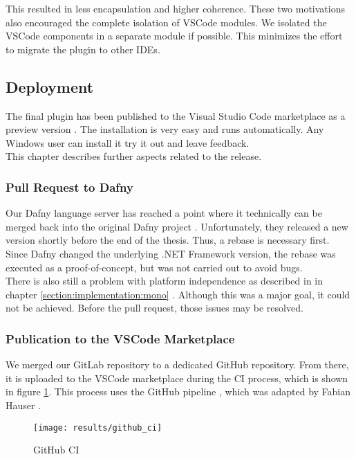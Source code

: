 This resulted in less encapsulation and higher coherence.
These two motivations also encouraged the complete isolation of VSCode modules.
We isolated the VSCode components in a separate module if possible.
This minimizes the effort to migrate the plugin to other IDEs.


\subsection{Deployment}
The final plugin has been published to the Visual Studio Code marketplace as a preview version \cite{our-dafny-plugin}.
The installation is very easy and runs automatically.
Any Windows user can install it \textendash{} try it out and leave feedback.\\

This chapter describes further aspects related to the release.

\subsubsection{Pull Request to Dafny}
Our Dafny language server has reached a point where it technically can be merged back into the original Dafny project \cite{dafny_lang_github}.
Unfortunately, they released a new version shortly before the end of the thesis.
Thus, a rebase is necessary first.
Since Dafny changed the underlying .NET Framework version, the rebase was executed as a proof-of-concept, but was not carried out to avoid bugs.\\

There is also still a problem with platform independence as described in in chapter
\ref{section:implementation:mono} \textendash{} .
Although this was a major goal, it could not be achieved.
Before the pull request, those issues may be resolved.


\subsubsection{Publication to the VSCode Marketplace}
We merged our GitLab repository to a dedicated GitHub repository.
From there, it is uploaded to the VSCode marketplace during the CI process, which is shown in figure \ref{fig:github_ci}.
This process uses the GitHub pipeline , which
was adapted by Fabian Hauser \cite{our-dafny-plugin-github-publish}.

\begin{figure}[H]
    \centering
    \texttt{[image: results/github\_ci]}
    \caption{GitHub CI}
    \label{fig:github_ci}
\end{figure}

